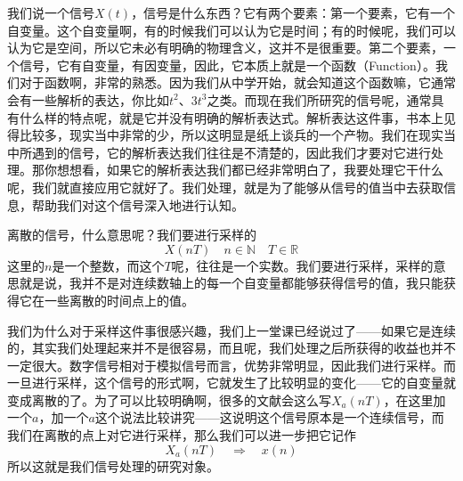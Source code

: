 \documentclass[a4paper,12pt]{article}
\begin{document}
我们说一个信号$X(t)$，信号是什么东西？它有两个要素：第一个要素，它有一个自变量。这个自变量啊，有的时候我们可以认为它是时间；有的时候呢，我们可以认为它是空间，所以它未必有明确的物理含义，这并不是很重要。第二个要素，一个信号，它有自变量，有因变量，因此，它本质上就是一个函数（Function）。我们对于函数啊，非常的熟悉。因为我们从中学开始，就会知道这个函数嘛，它通常会有一些解析的表达，你比如$t^2$、$3t^3$之类。而现在我们所研究的信号呢，通常具有什么样的特点呢，就是它并没有明确的解析表达式。解析表达这件事，书本上见得比较多，现实当中非常的少，所以这明显是纸上谈兵的一个产物。我们在现实当中所遇到的信号，它的解析表达我们往往是不清楚的，因此我们才要对它进行处理。那你想想看，如果它的解析表达我们都已经非常明白了，我要处理它干什么呢，我们就直接应用它就好了。我们处理，就是为了能够从信号的值当中去获取信息，帮助我们对这个信号深入地进行认知。


离散的信号，什么意思呢？我们要进行采样的
\begin{equation}
    X(nT)\quad n\in \mathbb{N}\quad T\in \mathbb{R}
\end{equation}
这里的$n$是一个整数，而这个$T$呢，往往是一个实数。我们要进行采样，采样的意思就是说，我并不是对连续数轴上的每一个自变量都能够获得信号的值，我只能获得它在一些离散的时间点上的值。

我们为什么对于采样这件事很感兴趣，我们上一堂课已经说过了——如果它是连续的，其实我们处理起来并不是很容易，而且呢，我们处理之后所获得的收益也并不一定很大。数字信号相对于模拟信号而言，优势非常明显，因此我们进行采样。而一旦进行采样，这个信号的形式啊，它就发生了比较明显的变化——它的自变量就变成离散的了。为了可以比较明确啊，很多的文献会这么写$X_a(nT)$，在这里加一个$a$，加一个$a$这个说法比较讲究——这说明这个信号原本是一个连续信号，而我们在离散的点上对它进行采样，那么我们可以进一步把它记作
\begin{equation}
    X_a(nT)\quad \Longrightarrow \quad x(n)
\end{equation}
所以这就是我们信号处理的研究对象。
\end{document}
